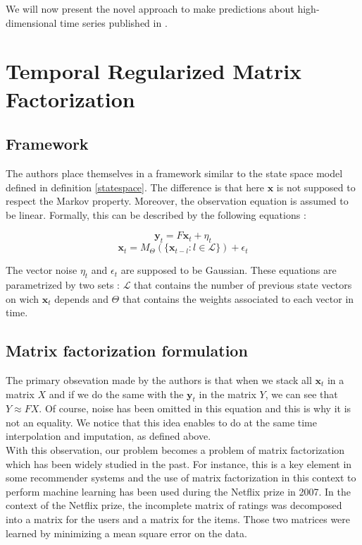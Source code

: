 \documentclass{article}
\begin{document}
We will now present the novel approach to make predictions about high-dimensional time series published in \cite{TRMF}.

\section{Temporal Regularized Matrix Factorization}
\label{sec:trmf}

\subsection*{Framework}
The authors place themselves in a framework similar to the state space model defined in definition \ref{statespace}.
The difference is that here $\mathbf{x}$ is not supposed to respect the Markov property. Moreover, the observation equation is assumed to be linear.
Formally, this can be described by the following equations :

\begin{equation}
\mathbf{y}_t = F\mathbf{x}_t + \eta_t
\end{equation}
\begin{equation}
\mathbf{x}_t = M_{\Theta}(\{\mathbf{x}_{t-l} : l \in \mathcal{L} \}) + \epsilon_t
\label{eq:evol}
\end{equation}

The vector noise $\eta_t$ and $\epsilon_t$ are supposed to be Gaussian. These equations are parametrized by two sets : $\mathcal{L}$ that contains the number of previous state vectors on wich $\mathbf{x}_t$ depends and $\Theta$ that contains the weights associated to each vector in time.

\subsection*{Matrix factorization formulation}
The primary obsevation made by the authors is that when we stack all $\mathbf{x}_t$ in a matrix $X$ and if we do the same with the $\mathbf{y}_t$ in the matrix $Y$, we can see that $Y \approx FX$. Of course, noise has been omitted in this equation and this is why it is not an equality. We notice that this idea enables to do at the same time interpolation and imputation, as defined above. \\

With this observation, our problem becomes a problem of matrix factorization which has been widely studied in the past. For instance, this is a key element in some recommender systems and the use of matrix factorization in this context to perform machine learning has been used during the Netflix prize in 2007.
In the context of the Netflix prize, the incomplete matrix of ratings was decomposed into a matrix for the users and a matrix for the items. Those two matrices were learned by minimizing a mean square error on the data. \\
\end{document}

